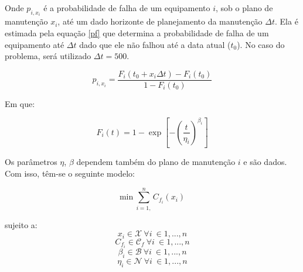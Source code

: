 Onde $p_{i,x_i}$ é a probabilidade de falha de um equipamento $i$, sob o plano de manutenção $x_i$, até um dado horizonte de planejamento da manutenção $\Delta t$. Ela é estimada pela equação \ref{pf} que determina a probabilidade de falha de um equipamento até $\Delta t$ dado que ele não falhou até a data atual ($t_0$). No caso do problema, será utilizado $\Delta t = 500$.

\begin{equation}
p_{i,x_i} = \frac{F_i(t_0 + x_i\Delta t) - F_i(t_0)}{1 - F_i(t_0)}
\label{pf}
\end{equation}

Em que:

\begin{equation}
F_i(t) = 1 - \exp{\left[ -{ \left( \frac{t}{\eta_i} \right) }^{\beta_i} \right]}
\end{equation}

Os parâmetros $\eta$, $\beta$ dependem também do plano de manutenção $i$ e são dados. Com isso, têm-se o seguinte modelo:

\begin{equation}
\mathrm{min}\ \sum_{i=1,}^{n} C_{f_i} (x_i) 
\label{sum_cf}
\end{equation}

sujeito a:
\begin{equation}
x_i \in \mathcal{X}\ \forall i\ \in 1, ..., n
\label{rest1_cf}
\end{equation}
\begin{equation}
C_{f_i} \in \mathcal{C}_{f}\ \forall i\ \in 1, ..., n
\label{rest2_cf}
\end{equation}
\begin{equation}
\beta_{i} \in \mathcal{B}\ \forall i\ \in 1, ..., n
\label{rest3_cf}
\end{equation}
\begin{equation}
\eta_{i} \in \mathcal{N}\ \forall i\ \in 1, ..., n
\label{rest4_cf}
\end{equation}